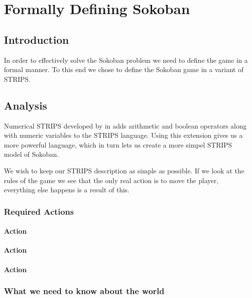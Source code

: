 \chapter{Formally Defining Sokoban}

\section{Introduction}
In order to effectively solve the Sokoban problem we need to define
the game in a formal manner. To this end we chose to define the
Sokoban game in a variant of STRIPS.



\section{Analysis}
Numerical STRIPS developed by \citet{Hoffmann03themetric-ff} in
\citeyear{Hoffmann03themetric-ff} adds arithmetic and boolean
operators along with numeric variables to the STRIPS language. Using
this extension gives us a more powerful language, which in turn lets
us create a more simpel STRIPS model of Sokoban.

We wish to keep our STRIPS description as simple as possible. If we
look at the rules of the game we see that the only real action is to
move the player, everything else happens is a result of this. 

\subsection{Required Actions}

\subsubsection{ Action}

\subsubsection{ Action}

\subsubsection{ Action}



\subsection{What we need to know about the world}



